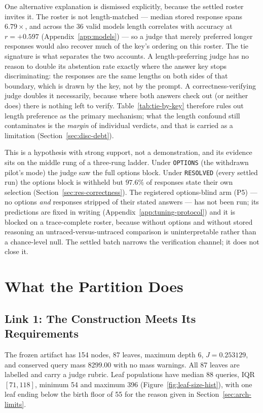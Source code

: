 One alternative explanation is dismissed explicitly, because the
settled roster invites it. The roster is not length-matched --- median stored response spans
$6.79\times$, and across the 36 valid models length correlates with
accuracy at $r = +0.597$ (Appendix~\ref{app:models}) --- so a judge
that merely preferred longer responses would also recover much of the
key's ordering on this roster. The tie signature is what separates the
two accounts. A length-preferring judge has no reason to double its
abstention rate exactly where the answer key stops discriminating: the
responses are the same lengths on both sides of that boundary, which
is drawn by the key, not by the prompt. A correctness-verifying judge
doubles it necessarily, because where both answers check out (or
neither does) there is nothing left to verify. Table~\ref{tab:tie-by-key}
therefore rules out length preference as the primary mechanism; what
the length confound still contaminates is the \emph{margin} of
individual verdicts, and that is carried as a limitation
(Section~\ref{sec:disc-debt}).

This is a hypothesis with strong support, not a demonstration, and
its evidence sits on the middle rung of a three-rung ladder. Under
\texttt{OPTIONS} (the withdrawn pilot's mode) the judge saw the full
options block. Under \texttt{RESOLVED} (every settled run) the
options block is withheld but $97.6\%$ of responses state their own
selection (Section~\ref{sec:res-correctness}). The registered
options-blind arm (P5) --- no options \emph{and} responses stripped of
their stated answers --- has not been run; its predictions are fixed
in writing (Appendix~\ref{app:tuning-protocol}) and it is blocked on
a trace-complete roster, because without options and without stored
reasoning an untraced-versus-untraced comparison is uninterpretable
rather than a chance-level null. The settled batch narrows the
verification channel; it does not close it.

\section{What the Partition Does}\label{sec:res-partition}

\subsection{Link 1: The Construction Meets Its Requirements}\label{sec:res-construction}

The frozen artifact has 154 nodes, 87 leaves,
maximum depth 6, $J = 0.253129$, and conserved query mass $8299.00$
with no mass warnings. All 87 leaves are labelled and carry a judge
rubric. Leaf populations have median 88 queries, IQR $[71, 118]$,
minimum 54 and maximum 396 (Figure~\ref{fig:leaf-size-hist}), with one
leaf ending below the birth floor of 55 for the reason given in
Section~\ref{sec:arch-limits}.

